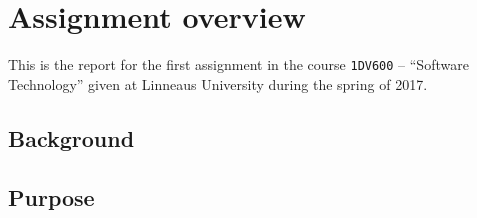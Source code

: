 %
%
%
%


\section{Assignment overview}

This is the report for the first assignment in the course \texttt{1DV600} --
``Software Technology'' given at Linneaus University during the spring of 2017.


\subsection{Background}



\subsection{Purpose}


